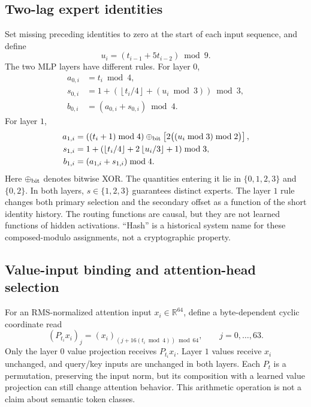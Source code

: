 \documentclass{article}
\begin{document}
\subsection{Two-lag expert identities}
Set missing preceding identities to zero at the start of each input sequence, and define
\begin{equation}
 u_i=(t_{i-1}+5t_{i-2})\bmod9.
 \label{eq:history}
\end{equation}
The two MLP layers have different rules. For layer $0$,
\begin{align}
 a_{0,i}&=t_i\bmod4,\\
 s_{0,i}&=1+\left(\left\lfloor t_i/4\right\rfloor+(u_i\bmod3)\right)\bmod3,\\
 b_{0,i}&=(a_{0,i}+s_{0,i})\bmod4.
 \label{eq:m0}
\end{align}
For layer $1$,
\begin{align}
 a_{1,i}&=((t_i+1)\bmod4)\mathbin{\oplus_{\rm bit}}\left[2\bigl((u_i\bmod3)\bmod2\bigr)\right],\\
 s_{1,i}&=1+\left(\left\lfloor t_i/4\right\rfloor+2\left\lfloor u_i/3\right\rfloor+1\right)\bmod3,\\
 b_{1,i}&=(a_{1,i}+s_{1,i})\bmod4.
 \label{eq:m1}
\end{align}
Here $\oplus_{\rm bit}$ denotes bitwise XOR. The quantities entering it lie in $\{0,1,2,3\}$ and $\{0,2\}$. In both layers, $s\in\{1,2,3\}$ guarantees distinct experts. The layer $1$ rule changes both primary selection and the secondary offset as a function of the short identity history. The routing functions are causal, but they are not learned functions of hidden activations. ``Hash'' is a historical system name for these composed-modulo assignments, not a cryptographic property.

\subsection{Value-input binding and attention-head selection}
For an RMS-normalized attention input $x_i\in\mathbb{R}^{64}$, define a byte-dependent cyclic coordinate read
\begin{equation}
 (P_{t_i}x_i)_j=(x_i)_{(j+16(t_i\bmod4))\bmod64},\qquad j=0,\ldots,63.
 \label{eq:v0}
\end{equation}
Only the layer $0$ value projection receives $P_{t_i}x_i$. Layer $1$ values receive $x_i$ unchanged, and query/key inputs are unchanged in both layers. Each $P_t$ is a permutation, preserving the input norm, but its composition with a learned value projection can still change attention behavior. This arithmetic operation is not a claim about semantic token classes.
\end{document}

